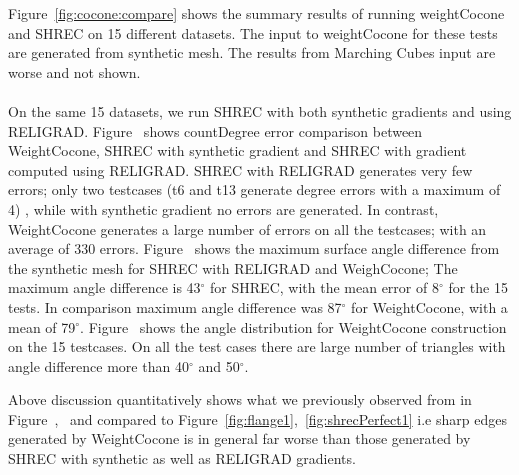 Figure~\ref{fig:cocone:compare} shows the summary results of running weightCocone and SHREC on 15 different datasets. 
The input to weightCocone  for these tests are generated from synthetic mesh. The results from Marching Cubes input are worse and not shown.
\paragraph{}
On the same 15 datasets, we run SHREC with both synthetic gradients and using RELIGRAD.
Figure~\protect{} shows countDegree error comparison between WeightCocone, SHREC with synthetic gradient and SHREC with gradient computed using RELIGRAD.  SHREC with RELIGRAD generates very few errors; only two testcases (t6 and t13 generate degree errors with a maximum of 4) , while with synthetic gradient no errors are generated. 
In contrast, WeightCocone generates a large number of errors on all the testcases; with an average of 330 errors. Figure~\protect{} shows the maximum surface angle difference from the synthetic mesh for SHREC with RELIGRAD and WeighCocone;
The maximum angle difference is 43$^\circ$ for SHREC, with the mean error of 8$^\circ$ for the 15 tests. In comparison maximum angle difference was 87$^\circ$ for WeightCocone, with a mean of 79$^\circ$.
Figure~\protect{} shows the angle distribution for WeightCocone construction on the 15 testcases. 
On all the test cases there are large number of triangles with angle difference more than 40$^\circ$ and 50$^\circ$.

Above discussion quantitatively shows what we previously observed from  in Figure~\protect{},~\protect{} and compared to Figure~\ref{fig:flange1},~\ref{fig:shrecPerfect1} i.e sharp edges generated by WeightCocone is in general far worse than those generated by SHREC with synthetic as well as RELIGRAD gradients. 

